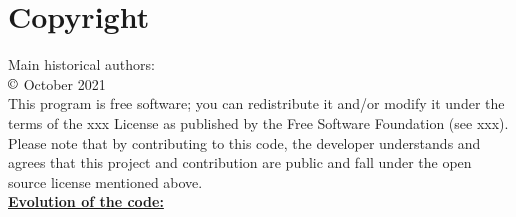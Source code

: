 \chapter*{Copyright}

Main historical authors: \\

$\copyright$ October 2021\\

\noindent
This program is free software; you can redistribute it and/or modify
it under the terms of the xxx License as published 
by the Free Software Foundation (see xxx).\\

\noindent
Please note that by contributing to this code, the developer understands and agrees that this project and contribution
are public and fall under the open source license mentioned above.\\

\noindent
\textbf{\underline{Evolution of the code:}}\\
